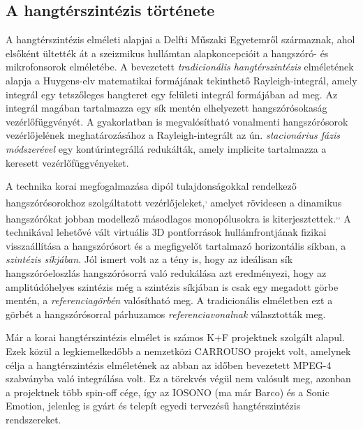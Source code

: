 \documentclass[10pt,twoside]{article}
\theoremstyle{thesisgroupstyle}
\theoremstyle{indented}
\begin{document}
\subsection{A hangtérszintézis története}
%
A hangtérszintézis elméleti alapjai a Delfti Műszaki Egyetemről származnak, ahol elsőként ültették át a szeizmikus hullámtan alapkoncepcióit a hangszóró- és mikrofonsorok elméletébe.
A bevezetett \emph{tradicionális hangtérszintézis} elméletének alapja a Huygens-elv matematikai formájának tekinthető Rayleigh-integrál, amely integrál egy tetszőleges hangteret egy felületi integrál formájában ad meg.
Az integrál magában tartalmazza egy sík mentén elhelyezett hangszórósokaság vezérlőfüggvényét.
A gyakorlatban is megvalósítható vonalmenti hangszórósorok vezérlőjelének meghatározásához a Rayleigh-integrált az ún. \emph{stacionárius fázis módszerével} egy kontúrintegrállá redukálták, amely implicite tartalmazza a keresett vezérlőfüggvényeket.

A technika korai megfogalmazása dipól tulajdonságokkal rendelkező hangszórósorokhoz szolgáltatott vezérlőjeleket,\textsuperscript{,} amelyet rövidesen a dinamikus hangszórókat jobban modellező másodlagos monopólusokra is kiterjesztettek.\textsuperscript{,}\textsuperscript{,}
A technikával lehetővé vált virtuális 3D pontforrások hullámfrontjának fizikai visszaállítása a hangszórósort és a megfigyelőt tartalmazó horizontális síkban, a \emph{szintézis síkjában}.
Jól ismert volt az a tény is, hogy az ideálisan sík hangszóróeloszlás hangszórósorrá való redukálása azt eredményezi, hogy az amplitúdóhelyes szintézis még a szintézis síkjában is csak egy megadott görbe mentén, a \emph{referenciagörbén} valósítható meg.
A tradicionális elméletben ezt a görbét a hangszórósorral párhuzamos \emph{referenciavonalnak} választották meg.

Már a korai hangtérszintézis elmélet is számos K+F projektnek szolgált alapul. 
Ezek közül a legkiemelkedőbb a nemzetközi CARROUSO projekt volt, amelynek célja a hangtérszintézis elméletének az abban az időben bevezetett MPEG-4 szabványba való integrálása volt.
Ez a törekvés végül nem valósult meg, azonban a projektnek több spin-off cége, így az IOSONO (ma már Barco) és a Sonic Emotion, jelenleg is gyárt és telepít egyedi tervezésű hangtérszintézis rendszereket.
\end{document}
